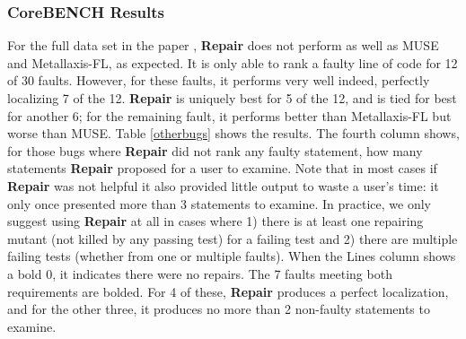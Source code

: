 \subsubsection{CoreBENCH Results} For the full data set in the paper \cite{Papadakis}, {\bf Repair} does not perform as well as MUSE and Metallaxis-FL, as expected.   It is only able to  rank a faulty line of code for 12 of 30 faults.  However, for these faults, it performs very well indeed, perfectly localizing 7 of the 12.  {\bf Repair} is uniquely best for 5 of the 12, and is tied for best for another 6; for the remaining fault, it performs better than Metallaxis-FL but worse than MUSE.  Table \ref{otherbugs} shows the results.  The fourth column shows, for those bugs where {\bf Repair} did not rank any faulty statement, how many statements {\bf Repair} proposed for a user to examine.  Note that in most cases if {\bf Repair} was not helpful it also provided little output to waste a user's time: it only once presented more than 3 statements to examine.   In practice, we only suggest using {\bf Repair} at all in cases where 1) there is at least one repairing mutant (not killed by any passing test) for a failing test and 2) there are multiple failing tests (whether from one or multiple faults).  When the Lines column shows a bold 0, it indicates there were no repairs.  The 7 faults meeting both requirements are bolded.  For 4 of these, {\bf Repair} produces a perfect localization, and for the other three, it produces no more than 2 non-faulty statements to examine.

